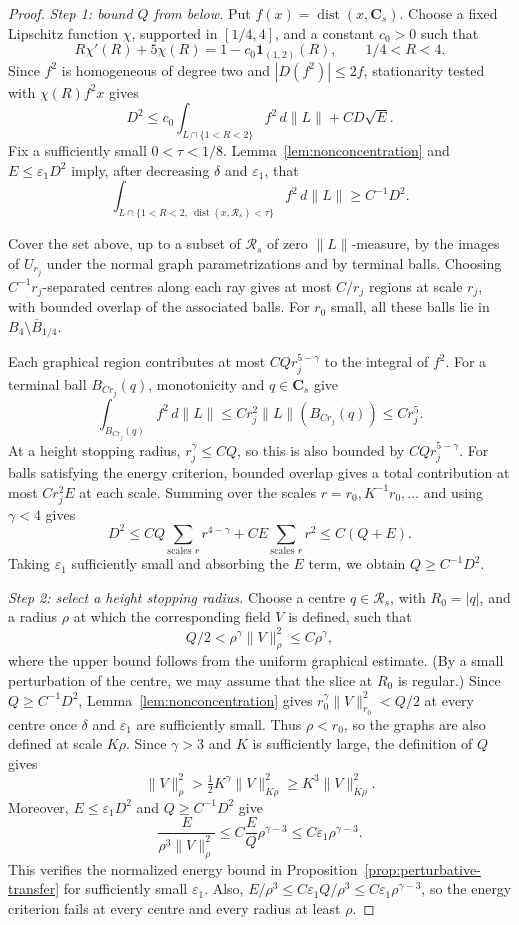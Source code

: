 \documentclass[11pt,a4paper]{article}
\numberwithin{equation}{section}
\theoremstyle{definition}
\theoremstyle{remark}
\newcommand{\dist}{\operatorname{dist}}
\begin{document}
	\begin{proof}
		\noindent\emph{Step 1: bound $Q$ from below.}
		Put $f(x)=\dist(x,\mathbf C_s)$.
		Choose a fixed Lipschitz function $\chi$, supported in $[1/4,4]$, and
		a constant $c_0>0$ such that
		\[
		R\chi'(R)+5\chi(R)=1-c_0\mathbf1_{(1,2)}(R),
		\qquad 1/4<R<4.
		\]
		Since $f^2$ is homogeneous of degree two and $|D(f^2)|\le2f$,
		stationarity tested with $\chi(R)f^2x$ gives
		\[
		D^2\le c_0\int_{L\cap\{1<R<2\}}f^2\,d\|L\|+CD\sqrt E.
		\]
		Fix a sufficiently small $0<\tau<1/8$.
		Lemma~\ref{lem:nonconcentration} and $E\le\varepsilon_1D^2$ imply,
		after decreasing $\delta$ and $\varepsilon_1$, that
		\[
		\int_{L\cap\{1<R<2,\ \dist(x,\mathcal R_s)<\tau\}}f^2\,d\|L\|
		\ge C^{-1}D^2.
		\]
		
		Cover the set above, up to a subset of $\mathcal R_s$ of zero
		$\|L\|$-measure, by the images of $U_{r_j}$ under the normal graph
		parametrizations and by terminal balls.
		Choosing $C^{-1}r_j$-separated centres along each ray gives at most
		$C/r_j$ regions at scale $r_j$, with bounded overlap of the associated
		balls. For $r_0$ small, all these balls lie in
		$B_4\setminus\overline B_{1/4}$.
		
		Each graphical region contributes at most $CQ r_j^{5-\gamma}$ to the
		integral of $f^2$. For a terminal ball $B_{Cr_j}(q)$, monotonicity and
		$q\in\mathbf C_s$ give
		\[
		\int_{B_{Cr_j}(q)}f^2\,d\|L\|
		\le Cr_j^2\|L\|(B_{Cr_j}(q))\le Cr_j^5.
		\]
		At a height stopping radius, $r_j^\gamma\le CQ$, so this is also bounded
		by $CQ r_j^{5-\gamma}$.
		For balls satisfying the energy criterion, bounded overlap gives a total
		contribution at most $Cr_j^2E$ at each scale.
		Summing over the scales $r=r_0,K^{-1}r_0,\ldots$ and using $\gamma<4$ gives
		\[
		D^2\le CQ\sum_{\text{scales }r}r^{4-\gamma}
		+CE\sum_{\text{scales }r}r^2
		\le C(Q+E).
		\]
		Taking $\varepsilon_1$ sufficiently small and absorbing the $E$ term,
		we obtain $Q\ge C^{-1}D^2$.
		
		\smallskip
		\noindent\emph{Step 2: select a height stopping radius.}
		Choose a centre $q\in\mathcal R_s$, with $R_0=|q|$, and a radius
		$\rho$ at which the corresponding field $V$ is defined, such that
		\[
		Q/2<\rho^\gamma\|V\|_\rho^2\le C\rho^\gamma,
		\]
		where the upper bound follows from the uniform graphical estimate.
		(By a small perturbation of the centre, we may assume that the slice
		at $R_0$ is regular.)
		Since $Q\ge C^{-1}D^2$, Lemma~\ref{lem:nonconcentration} gives
		$r_0^\gamma\|V\|_{r_0}^2<Q/2$ at every centre once $\delta$ and
		$\varepsilon_1$ are sufficiently small.
		Thus $\rho<r_0$, so the graphs are also defined at scale $K\rho$.
		Since $\gamma>3$ and $K$ is sufficiently large, the definition of $Q$ gives
		\[
		\|V\|_\rho^2>\tfrac12K^\gamma\|V\|_{K\rho}^2
		\ge K^3\|V\|_{K\rho}^2.
		\]
		Moreover, $E\le\varepsilon_1D^2$ and $Q\ge C^{-1}D^2$ give
		\[
		\frac{E}{\rho^3\|V\|_\rho^2}
		\le C\frac{E}{Q}\rho^{\gamma-3}
		\le C\varepsilon_1\rho^{\gamma-3}.
		\]
		This verifies the normalized energy bound in
		Proposition~\ref{prop:perturbative-transfer} for sufficiently small $\varepsilon_1$.
		Also, $E/\rho^3\le C\varepsilon_1Q/\rho^3
		\le C\varepsilon_1\rho^{\gamma-3}$, so the energy criterion fails
		at every centre and every radius at least $\rho$.
		

\end{proof}
\end{document}
